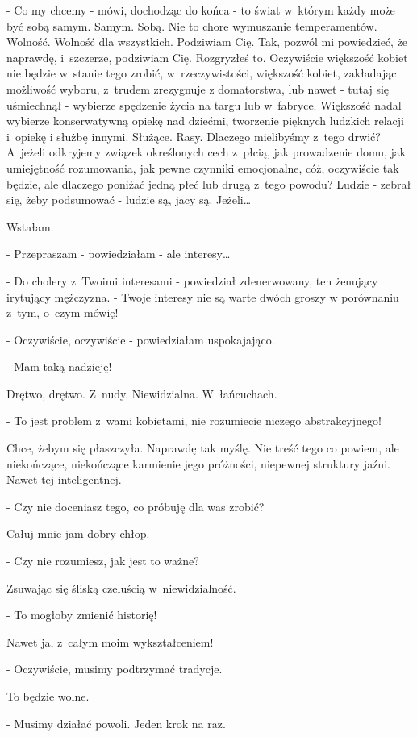\documentclass[oneside,polish,12pt,sfheadings]{mwbk}
\begin{document}
- Co my chcemy - mówi, dochodząc do końca - to świat w~którym każdy
może być sobą samym. Samym. Sobą. Nie to chore wymuszanie temperamentów.
Wolność. Wolność dla wszystkich. Podziwiam Cię. Tak, pozwól mi powiedzieć,
że naprawdę, i~szczerze, podziwiam Cię. Rozgryzłeś to. Oczywiście
większość kobiet nie będzie w~stanie tego zrobić, w~rzeczywistości,
większość kobiet, zakładając możliwość wyboru, z~trudem zrezygnuje
z domatorstwa, lub nawet - tutaj się uśmiechnął - wybierze spędzenie
życia na targu lub w~fabryce. Większość nadal wybierze konserwatywną
opiekę nad dziećmi, tworzenie pięknych ludzkich relacji i~opiekę i
służbę innymi. Służące. Rasy. Dlaczego mielibyśmy z~tego drwić? A~jeżeli odkryjemy związek
określonych cech z~płcią, jak prowadzenie domu, jak umiejętność rozumowania,
jak pewne czynniki emocjonalne, cóż, oczywiście tak będzie, ale
dlaczego poniżać jedną płeć lub drugą z~tego powodu? Ludzie - zebrał
się, żeby podsumować - ludzie są, jacy są. Jeżeli\ldots

Wstałam. 

- Przepraszam - powiedziałam - ale interesy\ldots

- Do cholery z~Twoimi interesami - powiedział zdenerwowany, ten żenujący
irytujący mężczyzna. - Twoje interesy nie są warte dwóch groszy w
porównaniu z~tym, o~czym mówię!

- Oczywiście, oczywiście - powiedziałam uspokajająco.

- Mam taką nadzieję!

Drętwo, drętwo. Z~nudy. Niewidzialna. W~łańcuchach.

- To jest problem z~wami kobietami, nie rozumiecie niczego abstrakcyjnego!

Chce, żebym się płaszczyła. Naprawdę tak myślę. Nie treść tego co
powiem, ale niekończące, niekończące karmienie jego próżności, niepewnej
struktury jaźni. Nawet tej inteligentnej.

- Czy nie doceniasz tego, co próbuję dla was zrobić?

Całuj-mnie-jam-dobry-chłop.

- Czy nie rozumiesz, jak jest to ważne?

Zsuwając się śliską czeluścią w~niewidzialność.

- To mogłoby zmienić historię!

Nawet ja, z~całym moim wykształceniem!

- Oczywiście, musimy podtrzymać tradycje.

To będzie wolne.

- Musimy działać powoli. Jeden krok na raz.
\end{document}
